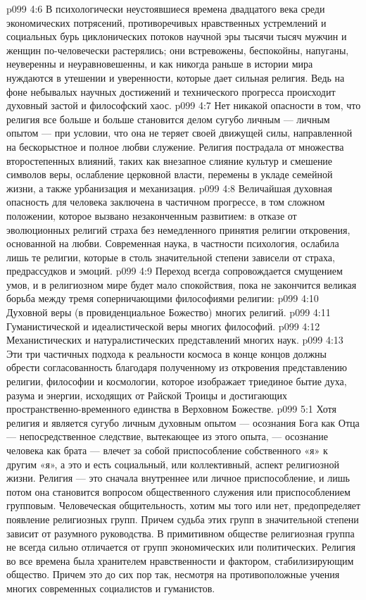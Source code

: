 \vs p099 4:6 \pc В психологически неустоявшиеся времена двадцатого века среди экономических потрясений, противоречивых нравственных устремлений и социальных бурь циклонических потоков научной эры тысячи тысяч мужчин и женщин по\hyp{}человечески растерялись; они встревожены, беспокойны, напуганы, неуверенны и неуравновешенны, и как никогда раньше в истории мира нуждаются в утешении и уверенности, которые дает сильная религия. Ведь на фоне небывалых научных достижений и технического прогресса происходит духовный застой и философский хаос.
\vs p099 4:7 \pc Нет никакой опасности в том, что религия все больше и больше становится делом сугубо личным --- личным опытом --- при условии, что она не теряет своей движущей силы, направленной на бескорыстное и полное любви служение. Религия пострадала от множества второстепенных влияний, таких как внезапное слияние культур и смешение символов веры, ослабление церковной власти, перемены в укладе семейной жизни, а также урбанизация и механизация.
\vs p099 4:8 Величайшая духовная опасность для человека заключена в частичном прогрессе, в том сложном положении, которое вызвано незаконченным развитием: в отказе от эволюционных религий страха без немедленного принятия религии откровения, основанной на любви. Современная наука, в частности психология, ослабила лишь те религии, которые в столь значительной степени зависели от страха, предрассудков и эмоций.
\vs p099 4:9 Переход всегда сопровождается смущением умов, и в религиозном мире будет мало спокойствия, пока не закончится великая борьба между тремя соперничающими философиями религии:
\vs p099 4:10 \bibnobreakspace Духовной веры (в провиденциальное Божество) многих религий.
\vs p099 4:11 \bibnobreakspace Гуманистической и идеалистической веры многих философий.
\vs p099 4:12 \bibnobreakspace Механистических и натуралистических представлений многих наук.
\vs p099 4:13 \pc Эти три частичных подхода к реальности космоса в конце концов должны обрести согласованность благодаря полученному из откровения представлению религии, философии и космологии, которое изображает триединое бытие духа, разума и энергии, исходящих от Райской Троицы и достигающих пространственно\hyp{}временного единства в Верховном Божестве.
\vs p099 5:1 Хотя религия и является сугубо личным духовным опытом --- осознания Бога как Отца --- непосредственное следствие, вытекающее из этого опыта, --- осознание человека как брата --- влечет за собой приспособление собственного «я» к другим «я», а это и есть социальный, или коллективный, аспект религиозной жизни. Религия --- это сначала внутреннее или личное приспособление, и лишь потом она становится вопросом общественного служения или приспособлением групповым. Человеческая общительность, хотим мы того или нет, предопределяет появление религиозных групп. Причем судьба этих групп в значительной степени зависит от разумного руководства. В примитивном обществе религиозная группа не всегда сильно отличается от групп экономических или политических. Религия во все времена была хранителем нравственности и фактором, стабилизирующим общество. Причем это до сих пор так, несмотря на противоположные учения многих современных социалистов и гуманистов.
